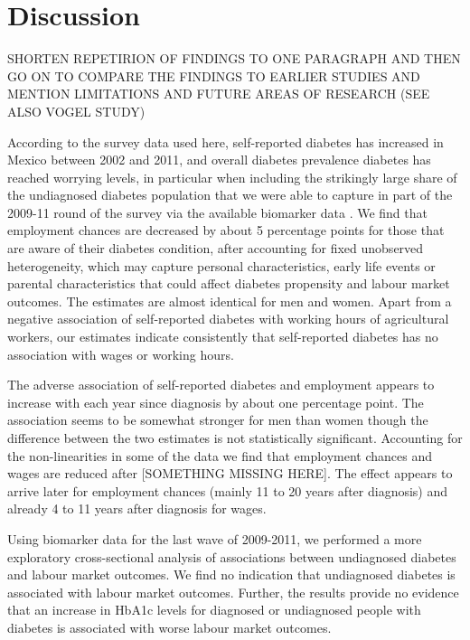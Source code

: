 \section{\noindent \label{sec:Conclusion}Discussion}


SHORTEN REPETIRION OF FINDINGS TO ONE PARAGRAPH AND THEN GO ON TO COMPARE THE FINDINGS TO EARLIER STUDIES AND MENTION LIMITATIONS AND FUTURE AREAS OF RESEARCH (SEE ALSO VOGEL STUDY)

According to the survey data used here, self-reported diabetes has increased in Mexico between 2002 and 2011, and overall
diabetes prevalence diabetes has reached worrying
levels, in particular when including the strikingly large share of the undiagnosed diabetes population that we were able to capture in part of the 2009-11 round of the survey via the available biomarker data \citep{Frankenberg2015}. We
find that employment chances are decreased by about 5 percentage points for those that are aware of their
diabetes condition, after accounting for
fixed unobserved heterogeneity, which may capture personal characteristics, early
life events or parental characteristics that could affect diabetes
propensity and labour market outcomes. The estimates are almost identical
for men and women. Apart from a negative association of self-reported
diabetes with working hours of agricultural workers, our estimates
indicate consistently that self-reported diabetes has no association with wages or working hours. 

The adverse association of self-reported diabetes and employment appears
to increase with each year since diagnosis by about one percentage
point. The association seems to be somewhat stronger for men than
women though the difference between the two estimates is not statistically
significant. Accounting for the non-linearities in some of the data
we find that employment chances and wages are reduced after [SOMETHING MISSING HERE]. The effect appears to arrive
later for employment chances (mainly 11 to 20 years after diagnosis)
and already 4 to 11 years after diagnosis for wages. 

Using biomarker data for the last wave of 2009-2011, we performed
a more exploratory cross-sectional analysis of associations between undiagnosed
diabetes and labour market outcomes. We find no indication that undiagnosed
diabetes is associated with labour market outcomes. Further, the results
provide no evidence that an increase in \ac{HbA1c} levels for diagnosed
or undiagnosed people with diabetes is associated with worse labour
market outcomes.

